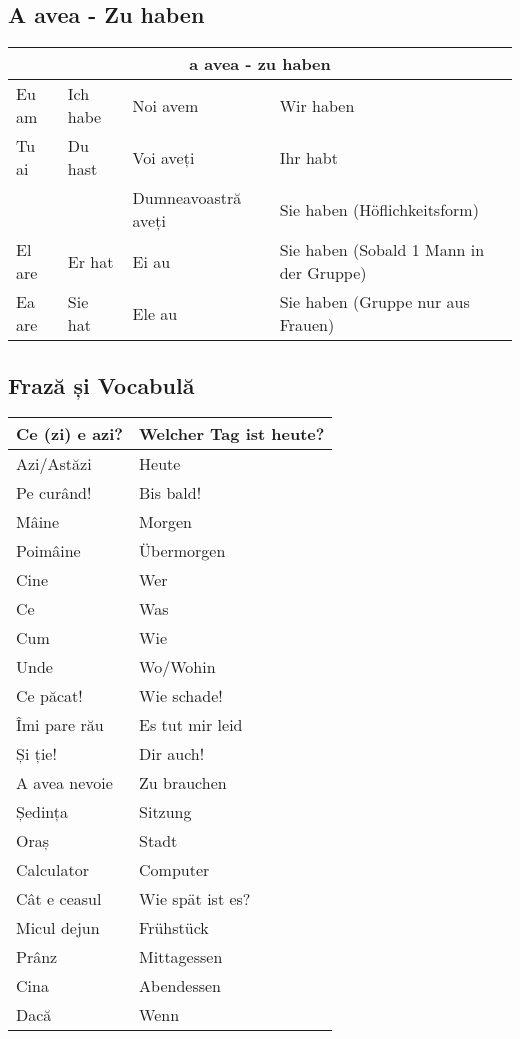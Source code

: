 \documentclass[11pt, oneside]{article}
\begin{document}
\subsection{A avea - Zu haben}
\begin{center}
  \begin{tabular}{ |p{2cm}|p{2cm}||l|l|  }
      \hline
      \multicolumn{4}{|c|}{a avea - zu haben} \\
      \hline
      \hline
      Eu am & Ich habe & Noi avem & Wir haben\\
      \hline
      Tu ai & Du hast & Voi aveți & Ihr habt\\
      & & Dumneavoastră aveți & Sie haben (Höflichkeitsform)\\
      \hline
      El are & Er hat & Ei au & Sie haben (Sobald 1 Mann in der Gruppe)\\ 
      Ea are & Sie hat & Ele au & Sie haben (Gruppe nur aus Frauen)\\
      \hline
     \end{tabular}
\end{center}
%
\subsection{Frază și Vocabulă}
\begin{center}
  \begin{tabular}{ | p{6cm}| p{6cm} | } 
    \hline
    Ce (zi) e azi? & Welcher Tag ist heute?\\
    \hline
    Azi/Astăzi &  Heute\\
    \hline
    Pe curând! & Bis bald!\\
    \hline
    Mâine & Morgen\\
    \hline
    Poimâine & Übermorgen\\
    \hline
    Cine & Wer \\
    \hline
    Ce & Was \\
    \hline
    Cum & Wie \\
    \hline
    Unde & Wo/Wohin\\
    \hline
    Ce păcat! & Wie schade!\\
    \hline
    Îmi pare rău & Es tut mir leid\\
    \hline
    Și ție! & Dir auch!\\
    \hline
    A avea nevoie & Zu brauchen\\
    \hline
    Ședința & Sitzung \\
    \hline
    Oraș & Stadt \\
    \hline
    Calculator & Computer \\
    \hline
    Cât e ceasul & Wie spät ist es?\\
    \hline
    Micul dejun & Frühstück\\
    \hline
    Prânz & Mittagessen\\
    \hline
    Cina & Abendessen\\
    \hline
    Dacă & Wenn\\
    \hline
  \end{tabular}
\end{center}
%
\pagebreak
\end{document}
